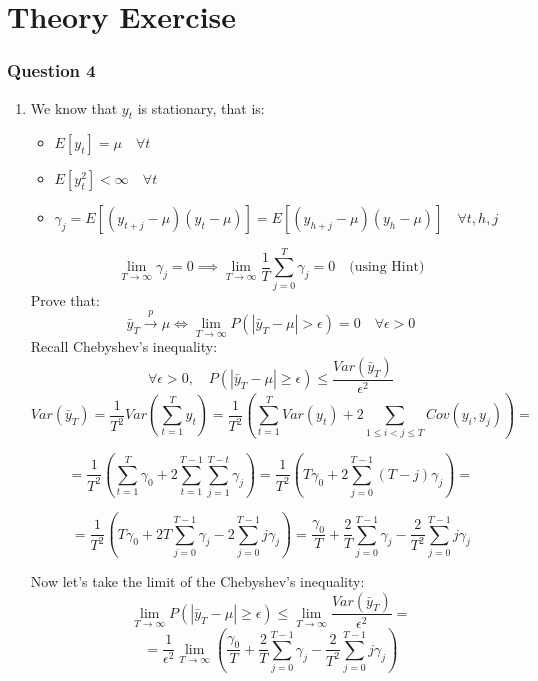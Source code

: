 \documentclass[10pt]{article}
\begin{document}
		
		\section*{Theory Exercise}
		\subsubsection*{Question 4}
		
		
		\begin{enumerate}
			\item We know that $y_t$ is stationary, that is:
			\begin{itemize}
				\item $E[y_t] = \mu \quad \forall t$
				\item $E[y_t^2] < \infty \quad \forall t$
				\item $\gamma_j = E[(y_{t+j} - \mu)(y_t - \mu)] = E[(y_{h+j} - \mu)(y_{h} - \mu)] \quad \forall t, h, j$
			\end{itemize}
			\[
			\lim\limits_{T\to\infty} \gamma_j = 0 \implies \lim\limits_{T\to\infty} \frac{1}{T} \sum\limits_{j=0}^{T} \gamma_j = 0 \quad \text{(using Hint)}
			\]
			Prove that:
			\[
			\bar{y}_T \xrightarrow{p} \mu \iff \lim\limits_{T\to\infty} P(|\bar{y}_T - \mu| > \epsilon) = 0 \quad \forall \epsilon > 0
			\]
			Recall Chebyshev's inequality:
			\[
			\forall \epsilon > 0, \quad P(|\bar{y}_T - \mu| \ge \epsilon) \le \frac{Var(\bar{y}_T)}{\epsilon^2}
			\]
			\[
			Var(\bar{y}_T) = \frac{1}{T^2} Var\left(\sum\limits_{t=1}^{T} y_t\right) = \frac{1}{T^2} \left( \sum\limits_{t=1}^{T} Var(y_t) + 2 \sum\limits_{1 \le i < j \le T} Cov(y_i, y_j) \right) =
			\]
			
			\[
			= \frac{1}{T^2} \left( \sum\limits_{t=1}^{T} \gamma_0 + 2 \sum\limits_{t=1}^{T-1} \sum\limits_{j=1}^{T-t} \gamma_j \right) = \frac{1}{T^2} \left( T\gamma_0 + 2 \sum\limits_{j=0}^{T-1} (T-j)\gamma_j \right) =
			\]
			
			\[
			= \frac{1}{T^2} \left( T\gamma_0 + 2 T \sum\limits_{j=0}^{T-1} \gamma_j - 2 \sum\limits_{j=0}^{T-1} j\gamma_j \right) = \frac{\gamma_0}{T} + \frac{2}{T} \sum\limits_{j=0}^{T-1} \gamma_j - \frac{2}{T^2} \sum\limits_{j=0}^{T-1} j\gamma_j
			\]
			
			Now let's take the limit of the Chebyshev's inequality:
			\[
			\lim\limits_{T\to\infty} P(|\bar{y}_T - \mu| \ge \epsilon) \le \lim\limits_{T\to\infty} \frac{Var(\bar{y}_T)}{\epsilon^2} = \]
			\[= \frac{1}{\epsilon^2} \lim\limits_{T\to\infty} \left( \frac{\gamma_0}{T} + \frac{2}{T} \sum\limits_{j=0}^{T-1} \gamma_j - \frac{2}{T^2} \sum\limits_{j=0}^{T-1} j\gamma_j \right)
			\]
			

\end{enumerate}
\end{document}
